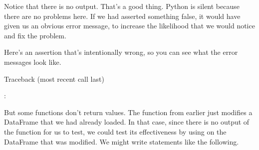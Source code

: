 \documentclass[letterpaper,10pt,english]{jupyterBook}
\begin{document}
\sphinxAtStartPar
Notice that there is no output.  That’s a good thing.  Python is silent because there are no problems here.  If we had asserted something false, it would have given us an obvious error message, to increase the likelihood that we would notice and fix the problem.

\sphinxAtStartPar
Here’s an assertion that’s intentionally wrong, so you can see what the error messages look like.

\begin{sphinxVerbatim}[commandchars=\\\{\}]
             
\end{sphinxVerbatim}

\begin{sphinxVerbatim}[commandchars=\\\{\}]
Traceback (most recent call last)
  
        

: 
\end{sphinxVerbatim}

\sphinxAtStartPar
But some functions don’t return values.  The  function from earlier just modifies a DataFrame that we had already loaded.  In that case, since there is no output of the function for us to test, we could test its effectiveness by using  on the DataFrame that was modified.  We might write statements like the following.
\end{document}
